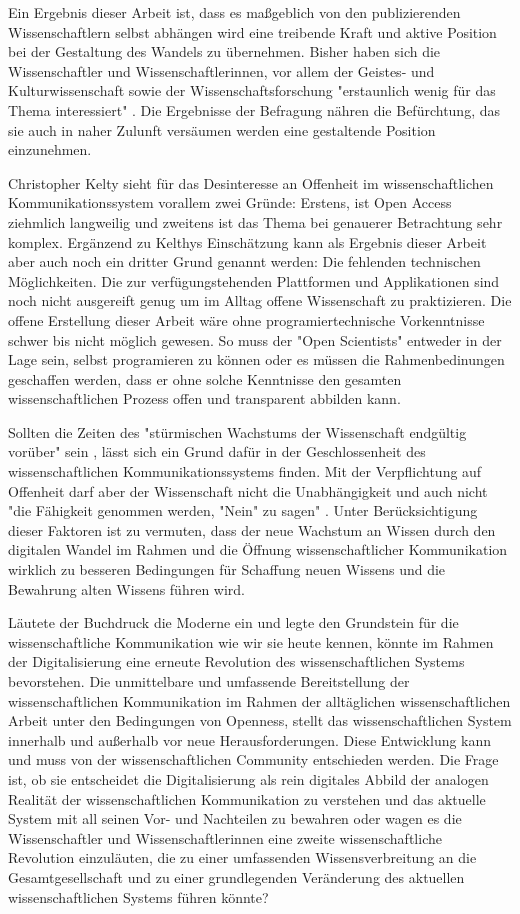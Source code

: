 Ein Ergebnis dieser Arbeit ist, dass es maßgeblich von den publizierenden Wissenschaftlern selbst abhängen wird eine treibende Kraft und aktive Position bei der Gestaltung des Wandels zu übernehmen. Bisher haben sich die Wissenschaftler und Wissenschaftlerinnen, vor allem der Geistes- und Kulturwissenschaft sowie der Wissenschaftsforschung "erstaunlich wenig für das Thema interessiert" \cite{hagner_2015_sache_buches}. Die Ergebnisse der Befragung nähren die Befürchtung, das sie auch in naher Zulunft versäumen werden eine gestaltende Position einzunehmen.

Christopher Kelty sieht für das Desinteresse an Offenheit im wissenschaftlichen Kommunikationssystem vorallem zwei Gründe: Erstens, ist Open Access ziehmlich langweilig und zweitens ist das Thema bei genauerer Betrachtung sehr komplex. Ergänzend zu Kelthys Einschätzung kann als Ergebnis dieser Arbeit aber auch noch ein dritter Grund genannt werden: Die fehlenden technischen Möglichkeiten. Die zur verfügungstehenden Plattformen und Applikationen sind noch nicht ausgereift genug um im Alltag offene Wissenschaft zu praktizieren. Die offene Erstellung dieser Arbeit wäre ohne programiertechnische Vorkenntnisse schwer bis nicht möglich gewesen. So muss der "Open Scientists" entweder in der Lage sein, selbst programieren zu können oder es müssen die Rahmenbedinungen geschaffen werden, dass er ohne solche Kenntnisse den gesamten wissenschaftlichen Prozess offen und transparent abbilden kann.

Sollten die Zeiten des "stürmischen Wachstums der Wissenschaft endgültig vorüber" sein \cite{K_lbel_2002}, lässt sich ein Grund dafür in der Geschlossenheit des wissenschaftlichen Kommunikationssystems finden. Mit der Verpflichtung auf Offenheit darf aber der Wissenschaft nicht die Unabhängigkeit und auch nicht "die Fähigkeit genommen werden, "Nein" zu sagen" \cite{suchen_Hornbostel_2006}. Unter Berücksichtigung dieser Faktoren ist zu vermuten, dass der neue Wachstum an Wissen durch den digitalen Wandel im Rahmen und die Öffnung wissenschaftlicher Kommunikation wirklich zu besseren Bedingungen für Schaffung neuen Wissens und die Bewahrung alten Wissens führen wird.

Läutete der Buchdruck die Moderne ein und legte den Grundstein für die wissenschaftliche Kommunikation wie wir sie heute kennen, könnte im Rahmen der Digitalisierung eine erneute Revolution des wissenschaftlichen Systems bevorstehen. Die unmittelbare und umfassende Bereitstellung der wissenschaftlichen Kommunikation im Rahmen der alltäglichen wissenschaftlichen Arbeit unter den Bedingungen von Openness, stellt das wissenschaftlichen System innerhalb und außerhalb vor neue Herausforderungen.
Diese Entwicklung kann und muss von der wissenschaftlichen Community entschieden werden. Die Frage ist, ob sie entscheidet die Digitalisierung als rein digitales Abbild der analogen Realität der wissenschaftlichen Kommunikation zu verstehen und das aktuelle System mit all seinen Vor- und Nachteilen zu bewahren oder wagen es die Wissenschaftler und Wissenschaftlerinnen eine zweite wissenschaftliche Revolution einzuläuten, die zu einer umfassenden Wissensverbreitung an die Gesamtgesellschaft und zu einer grundlegenden Veränderung des aktuellen wissenschaftlichen Systems führen könnte?

